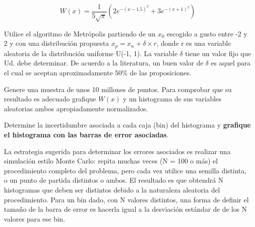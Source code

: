\documentclass[letter, 11pt]{article}
\begin{document}
$$
W(x) = \frac{1}{5\sqrt{\pi}} \left( 2 e^{-(x-1.5)^2} + 3 e^{-(x+1)^2} \right)
$$

Utilice el algoritmo de Metrópolis partiendo de un $x_0$ escogido a gusto entre
-2 y 2 y con una distribución propuesta $x_p = x_n + \delta \times r$, donde r
es una variable aleatoria de la distribución uniforme U(-1, 1). La variable
$\delta$ tiene un valor fijo que Ud. debe determinar. De acuerdo a la
literatura, un buen valor  de $\delta$ es aquel para el cual se aceptan
aproximadamente 50\% de las proposiciones.

Genere una muestra de unos 10 millones de puntos. Para comprobar que su
resultado es adecuado grafique $W(x)$ y un histograma de sus variables
aleatorias ambos apropiadamente normalizados.

Determine la incertidumbre asociada a cada caja (bin) del histograma y \textbf{
grafique el histograma con las barras de error asociadas}.

\begin{ayuda}
  \small

  La estrategia sugerida para determinar los errores asociados es realizar una
  simulación estilo Monte Carlo: repita muchas veces (N = 100 o más) el
  procedimiento completo del problema, pero cada vez utilice una semilla
  distinta, o un punto de partida distintos o ambos. El resultado es que
  obtendrá N histogramas que deben ser distintos debido a la naturaleza
  aleatoria del procedimiento. Para un bin dado, con N valores distintos, una
  forma de definir el tamaño de la barra de error es hacerla igual a la
  desviación estándar de de los N valores para ese bin.

\end{ayuda}


\end{document}
